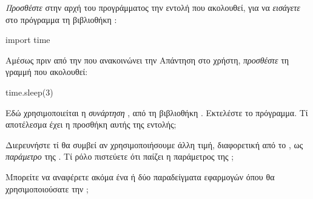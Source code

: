 \documentclass[a4paper,11pt,oneside]{book}
\begin{document}
\begin{step}
\emph{Προσθέστε} στην αρχή του προγράμματος την εντολή που ακολουθεί, για να \emph{εισάγετε} στο πρόγραμμα τη βιβλιοθήκη :

\begin{pynew}
import time
\end{pynew}


Αμέσως πριν από την  που ανακοινώνει την Απάντηση στο χρήστη, \emph{προσθέστε} τη γραμμή που ακολουθεί:

\begin{pynew}
time.sleep(3)
\end{pynew}



Εδώ χρησιμοποιείται η \emph{συνάρτηση} , από τη βιβλιοθήκη . Εκτελέστε το πρόγραμμα. Τί αποτέλεσμα έχει η προσθήκη αυτής της εντολής;

\marginnote[14pt]{\icondiscuss}
\dottedline

Διερευνήστε τί θα συμβεί αν χρησιμοποιήσουμε άλλη τιμή, διαφορετική από το , ως \emph{παράμετρο} της . Tί ρόλο πιστεύετε ότι παίζει η παράμετρος της ;


\marginnote[14pt]{\icondiscuss}
\dottedline

Μπορείτε να αναφέρετε ακόμα ένα ή δύο παραδείγματα εφαρμογών όπου θα χρησιμοποιούσατε την ;

\marginnote[14pt]{\icondiscuss}
\dottedline
\end{step}
\end{document}
